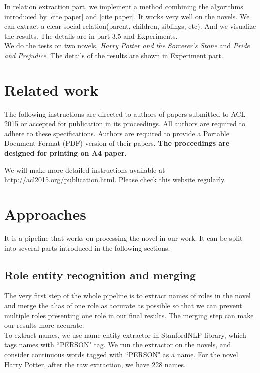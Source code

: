 \documentclass[11pt]{article}
\begin{document}
In relation extraction part, we implement a method combining the algorithms introduced by 
[cite paper] and [cite paper]. It works very well on the novels. We can extract a clear social relation(parent, children, siblings, etc). And we visualize the results. The details are in part 3.5 and Experiments. \\

We do the tests on two novels, \textit{Harry Potter and the Sorcerer's Stone} and \textit{Pride and Prejudice}. The details of the results are shown in Experiment part.

\section{Related work} %

The following instructions are directed to authors of papers submitted
to ACL-2015 or accepted for publication in its proceedings. All
authors are required to adhere to these specifications. Authors are
required to provide a Portable Document Format (PDF) version of their
papers. \textbf{The proceedings are designed for printing on A4
paper.}

We will make more detailed instructions available at
\url{http://acl2015.org/publication.html}. Please check this website 
regularly.


\section{Approaches}

It is a pipeline that works on processing the novel in our work. It can be split into several parts introduced in the following sections.

\subsection{Role entity recognition and merging} %

The very first step of the whole pipeline is to extract names of roles in the novel and merge the alias of one role as accurate as possible so that we can prevent multiple roles presenting one role in our final results. The merging step can make our results more accurate. \\

To extract names, we use name entity extractor in StanfordNLP library, which tags names with ``PERSON" tag. We run the extractor on the novels, and consider continuous words tagged with ``PERSON" as a name. For the novel Harry Potter, after the raw extraction, we have 228 names. \\
\end{document}
